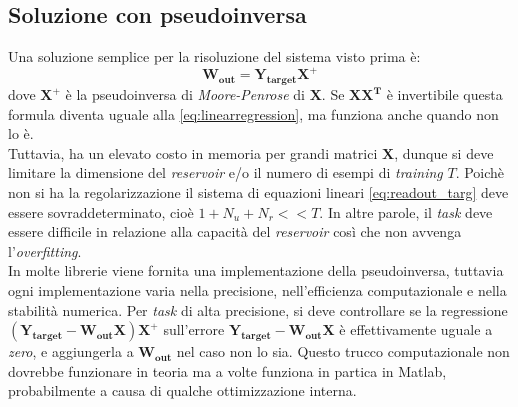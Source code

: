 \subsection{Soluzione con pseudoinversa}
Una soluzione semplice per la risoluzione del sistema visto prima è:
\begin{equation} \label{eq:pseudoinversa}
\mathbf{W_{out}}= \mathbf{Y_{target}X^+}
\end{equation}
dove $\mathbf{X^+}$ è la pseudoinversa di \textit{Moore-Penrose} di $\mathbf{X}$. Se $\mathbf{XX^T}$ è invertibile questa formula diventa uguale alla \ref{eq:linearregression}, ma funziona anche quando non lo è.\\
Tuttavia, ha un elevato costo in memoria per grandi matrici $\mathbf{X}$, dunque si deve limitare la dimensione del \textit{reservoir} e/o il numero di esempi di \textit{training} $T$.
Poichè non si ha la regolarizzazione il sistema di equazioni lineari \ref{eq:readout_targ} deve essere sovraddeterminato, cioè $ 1+N_u+ N_r << T$. In altre parole, il \textit{task} deve essere difficile in relazione alla capacità del \textit{reservoir} così che non avvenga l'\textit{overfitting}.\\
In molte librerie viene fornita una implementazione della pseudoinversa, tuttavia ogni implementazione varia nella precisione, nell'efficienza computazionale e nella stabilità numerica. Per \textit{task} di alta precisione, si deve controllare se la regressione $\mathbf{(Y_{target} -W_{out}X)X^+}$ sull'errore $\mathbf{Y_{target} -W_{out}X}$ è effettivamente uguale a \textit{zero}, e aggiungerla a $\mathbf{W_{out}}$ nel caso non lo sia. Questo trucco computazionale non dovrebbe funzionare in teoria ma a volte funziona in partica in Matlab, probabilmente a causa di qualche ottimizzazione interna.

